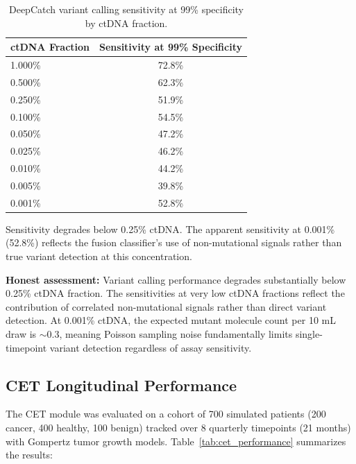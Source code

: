 \documentclass[10pt,a4paper]{article}
\begin{document}
\begin{table}[H]
\centering
\caption{DeepCatch variant calling sensitivity at 99\% specificity by ctDNA fraction.}
\label{tab:variant_lod}
\begin{tabular}{l c}
\toprule
\textbf{ctDNA Fraction} & \textbf{Sensitivity at 99\% Specificity} \\
\midrule
1.000\% & 72.8\% \\
0.500\% & 62.3\% \\
0.250\% & 51.9\% \\
0.100\% & 54.5\% \\
0.050\% & 47.2\% \\
0.025\% & 46.2\% \\
0.010\% & 44.2\% \\
0.005\% & 39.8\% \\
0.001\% & 52.8\% \\
\bottomrule
\end{tabular}
\vspace{0.3cm}
\footnotesize{Sensitivity degrades below 0.25\% ctDNA. The apparent sensitivity at 0.001\% (52.8\%) reflects the fusion classifier's use of non-mutational signals rather than true variant detection at this concentration.}
\end{table}

\textbf{Honest assessment:} Variant calling performance degrades substantially below 0.25\% ctDNA fraction. The sensitivities at very low ctDNA fractions reflect the contribution of correlated non-mutational signals rather than direct variant detection. At 0.001\% ctDNA, the expected mutant molecule count per 10 mL draw is $\sim$0.3, meaning Poisson sampling noise fundamentally limits single-timepoint variant detection regardless of assay sensitivity.

\subsection{CET Longitudinal Performance}

The CET module was evaluated on a cohort of 700 simulated patients (200 cancer, 400 healthy, 100 benign) tracked over 8 quarterly timepoints (21 months) with Gompertz tumor growth models. Table~\ref{tab:cet_performance} summarizes the results:
\end{document}
